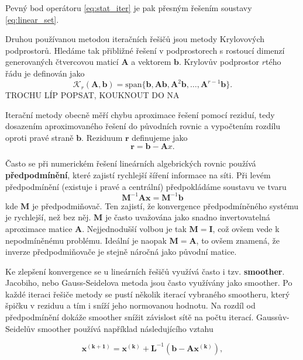 \documentclass[a4paper,12pt]{report}
\theoremstyle{remark}
\begin{document}
	Pevný bod operátoru \eqref{eq:stat_iter} je pak přesným řešením soustavy \eqref{eq:linear_set}.  
	
	Druhou používanou metodou iteračních řešičů jsou metody Krylovových podprostorů. Hledáme tak přibližné řešení v podprostorech s rostoucí dimenzí generovaných čtvercovou maticí $\boldsymbol{A}$ a vektorem $\boldsymbol{b}$. Krylovův podprostor $r$tého řádu je definován jako 
	$$\mathcal{K}_r(\boldsymbol{A},\boldsymbol{b}) = \textrm{span}\{\boldsymbol{b}, \boldsymbol{Ab}, \boldsymbol{A}^2\boldsymbol{b}, \dots, \boldsymbol{A}^{r-1}\boldsymbol{b}\}.$$
	TROCHU LÍP POPSAT, KOUKNOUT DO NA
	
	Iterační metody obecně měří chybu aproximace řešení pomocí reziduí, tedy dosazením aproximovaného řešení do původních rovnic a vypočtením rozdílu oproti pravé straně $\boldsymbol{b}$. Reziduum $\boldsymbol{r}$ definujeme jako 
	\begin{equation}
		\boldsymbol{r} = \boldsymbol{b}-\boldsymbol{A}x.
		\label{eq:residuum}
	\end{equation} 
	
	
	Často se při numerickém řešení lineárních algebrických rovnic používá \textbf{předpodmínění}, které zajistí rychlejší šíření informace na síti. Při levém předpodmínění (existuje i pravé a centrální) předpokládáme soustavu ve tvaru
	$$\boldsymbol{M}^{-1}\boldsymbol{A}\boldsymbol{x} =\boldsymbol{M}^{-1}\boldsymbol{b}$$
	kde $\boldsymbol{M}$ je předpodmiňovač. Ten zajistí, že konvergence předpodmíněného systému je rychlejší, než bez něj. $\boldsymbol{M}$ je často uvažována jako snadno invertovatelná aproximace matice $\boldsymbol{A}$. Nejjednodušší volbou je tak $\boldsymbol{M} = \boldsymbol{I}$, což ovšem vede k nepodmíněnému problému. Ideální je naopak $\boldsymbol{M} = \boldsymbol{A}$, to ovšem znamená, že inverze předpodmiňovače je stejně náročná jako původní matice.
	

	Ke zlepšení konvergence se u lineárních řešičů využívá často i tzv. \textbf{smoother}. Jacobiho, nebo Gauss-Seidelova metoda jsou často využívány jako smoother. Po každé iteraci řešiče metody se pustí několik iterací vybraného smootheru, který  špičku v reziduu a tím i sníží jeho normovanou hodnotu. Na rozdíl od předpodmínění dokáže smoother snížit závislost sítě na počtu iterací. Gaussův-Seidelův smoother používá například následujícího vztahu
	
	\begin{equation}
		\boldsymbol{x^{(k+1)}} = \boldsymbol{x^{(k)}}+\boldsymbol{L}^{-1}(\boldsymbol{b} -  \boldsymbol{A}\boldsymbol{x^{(k)}}),
		\label{eq:gs_smoother}
	\end{equation}
\end{document}
